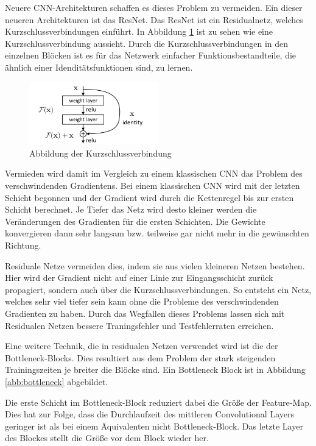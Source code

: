 Neuere CNN-Architekturen schaffen es dieses Problem zu vermeiden. Ein dieser neueren Architekturen ist das ResNet. Das ResNet ist ein Residualnetz, welches Kurzschlussverbindungen einführt. In Abbildung \ref{abb:residual} ist zu sehen wie eine Kurzschlussverbindung aussieht. Durch die Kurzschlussverbindungen in den einzelnen Blöcken ist es für das Netzwerk einfacher Funktionsbestandteile, die ähnlich einer Idenditätsfunktionen sind, zu lernen.   

\begin{figure}[h]
 \centering
 \includegraphics[width=0.5\textwidth]{KapitelPartA/images/kurzschluss.png}
 \caption{Abbildung der Kurzschlussverbindung \cite{resnet}}
 \label{abb:residual}
\end{figure}



Vermieden wird damit im Vergleich zu einem klassischen CNN das Problem des verschwindenden Gradientens. Bei einem klassischen CNN wird mit der letzten Schicht begonnen und der Gradient wird durch die Kettenregel bis zur ersten Schicht berechnet. Je Tiefer das Netz wird desto kleiner werden die Veränderungen des Gradienten für die ersten Schichten. Die Gewichte konvergieren dann sehr langsam bzw. teilweise gar nicht mehr in die gewünschten Richtung.


Residuale Netze vermeiden dies, indem sie aus vielen kleineren Netzen bestehen. Hier wird der Gradient nicht auf einer Linie zur Eingangsschicht zurück propagiert, sondern auch über die Kurzschlussverbindungen. So entsteht ein Netz, welches sehr viel tiefer sein kann ohne die Probleme des verschwindenden Gradienten zu haben. Durch das Wegfallen dieses Problems lassen sich mit Residualen Netzen bessere Traningsfehler und Testfehlerraten erreichen.

Eine weitere Technik, die in residualen Netzen verwendet wird ist die der Bottleneck-Blocks. Dies resultiert aus dem Problem der stark steigenden Trainingszeiten je breiter die Blöcke sind. Ein Bottleneck Block ist in Abbildung \ref{abb:bottleneck} abgebildet.

Die erste Schicht im Bottleneck-Block reduziert dabei die Größe der Feature-Map. Dies hat zur Folge, dass die Durchlaufzeit des mittleren Convolutional Layers geringer ist als bei einem Äquivalenten nicht Bottleneck-Block. Das letzte Layer des Blockes stellt die Größe vor dem Block wieder her.

